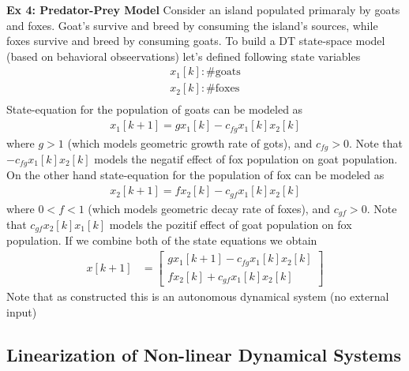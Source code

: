 \documentclass[twoside]{article}
\begin{document}
\vspace{6pt}

\textbf{Ex 4: Predator-Prey Model}
%
Consider an island populated primaraly by goats and foxes. Goat's
survive and breed by consuming the island's sources, while foxes
survive and breed by consuming goats. To build a DT state-space model
(based on behavioral obseervations) let's defined following state
variables
%
  \begin{align*}
    x_1[k] : \# \mathrm{goats} \\
    x_2[k] : \# \mathrm{foxes} \\
  \end{align*}
%
State-equation for the population of goats can be modeled as
%
  \begin{align*}
    x_1[k+1] = g x_1[k] - c_{fg} x_1[k] x_2[k] 
  \end{align*}
%
where $g > 1$ (which models geometric growth rate of gots), and
$c_{fg} > 0$. Note that $- c_{fg} x_1[k] x_2[k] $ models the negatif
effect of fox population on goat population. On the other hand 
state-equation for the population of fox can be modeled as
%
  \begin{align*}
    x_2[k+1] = f x_2[k] - c_{gf} x_1[k] x_2[k] 
  \end{align*}
%
where $0 < f < 1$ (which models geometric decay rate of foxes), and
$c_{gf} > 0$. Note that $c_{gf} x_2[k] x_1[k] $ models the pozitif
effect of goat population on fox population. If we combine both of the 
state equations we obtain
%
\begin{align*}
	x[k+1] &= \left[ \begin{array}{c} g x_1[k+1] - c_{fg} x_1[k] x_2[k]   \\ 
                          f x_2[k] + c_{gf} x_1[k] x_2[k]  \end{array} \right] 
\end{align*}
%
Note that as constructed this is an autonomous dynamical system (no
external input)

\subsection{Linearization of Non-linear Dynamical Systems}
\end{document}
